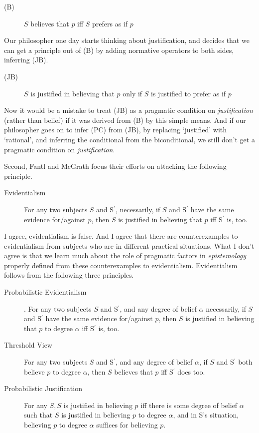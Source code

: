 \begin{description}
\item[(B)] \(S\) believes that \(p\) iff \(S\) prefers as if \(p\)
\end{description}

\noindent Our philosopher one day starts thinking about justification, and decides that we can get a principle out of (B) by adding normative operators to both sides, inferring (JB).

\begin{description}
\item[(JB)] \(S\) is justified in believing that \(p\) only if \(S\) is justified to prefer as if \(p\)
\end{description}

\noindent Now it would be a mistake to treat (JB) as a pragmatic condition on \textit{justification} (rather than belief) if it was derived from (B) by this simple means. And if our philosopher goes on to infer (PC) from (JB), by replacing `justified' with `rational', and inferring the conditional from the biconditional, we still don't get a pragmatic condition on \textit{justification}.

Second, Fantl and McGrath focus their efforts on attacking the following principle.

\begin{description}
\item[Evidentialism] For any two subjects \(S\) and S\(^\prime\), necessarily, if \(S\) and S\(^\prime\) have the same evidence for/against \(p\), then \(S\) is justified in believing that \(p\) iff S\(^\prime\) is, too.
\end{description}

\noindent I agree, evidentialism is false. And I agree that there are counterexamples to evidentialism from subjects who are in different practical situations. What I don't agree is that we learn much about the role of pragmatic factors in \textit{epistemology} properly defined from these counterexamples to evidentialism. Evidentialism follows from the following three principles.

\begin{description}
\item[Probabilistic Evidentialism]. For any two subjects \(S\) and S\(^\prime\), and any degree of belief \(\alpha\) necessarily, if \(S\) and S\(^\prime\) have the same evidence for/against \(p\), then \(S\) is justified in believing that \(p\) to degree \(\alpha\) iff S\(^\prime\) is, too.
\item[Threshold View] For any two subjects \(S\) and S\(^\prime\), and any degree of belief \(\alpha\), if \(S\) and S\(^\prime\) both believe \(p\) to degree \(\alpha\), then \(S\) believes that \(p\) iff S\(^\prime\) does too.
\item[Probabilistic Justification] For any \(S, S\) is justified in believing \(p\) iff there is some degree of belief \(\alpha\) such that \(S\) is justified in believing \(p\) to degree \(\alpha\), and in S's situation, believing \(p\) to degree \(\alpha\) suffices for believing \(p\).
\end{description}

